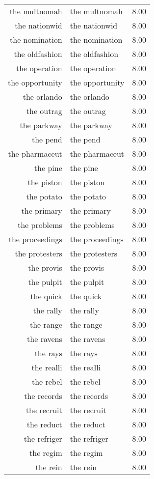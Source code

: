 \begin{table}[ht]
\begin{tabular}{rlr}
  the multnomah & the multnomah & 8.00 \\ 
  the nationwid & the nationwid & 8.00 \\ 
  the nomination & the nomination & 8.00 \\ 
  the oldfashion & the oldfashion & 8.00 \\ 
  the operation & the operation & 8.00 \\ 
  the opportunity & the opportunity & 8.00 \\ 
  the orlando & the orlando & 8.00 \\ 
  the outrag & the outrag & 8.00 \\ 
  the parkway & the parkway & 8.00 \\ 
  the pend & the pend & 8.00 \\ 
  the pharmaceut & the pharmaceut & 8.00 \\ 
  the pine & the pine & 8.00 \\ 
  the piston & the piston & 8.00 \\ 
  the potato & the potato & 8.00 \\ 
  the primary & the primary & 8.00 \\ 
  the problems & the problems & 8.00 \\ 
  the proceedings & the proceedings & 8.00 \\ 
  the protesters & the protesters & 8.00 \\ 
  the provis & the provis & 8.00 \\ 
  the pulpit & the pulpit & 8.00 \\ 
  the quick & the quick & 8.00 \\ 
  the rally & the rally & 8.00 \\ 
  the range & the range & 8.00 \\ 
  the ravens & the ravens & 8.00 \\ 
  the rays & the rays & 8.00 \\ 
  the realli & the realli & 8.00 \\ 
  the rebel & the rebel & 8.00 \\ 
  the records & the records & 8.00 \\ 
  the recruit & the recruit & 8.00 \\ 
  the reduct & the reduct & 8.00 \\ 
  the refriger & the refriger & 8.00 \\ 
  the regim & the regim & 8.00 \\ 
  the rein & the rein & 8.00 \\ 

\end{tabular}
\end{table}
